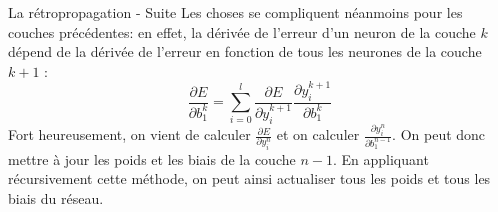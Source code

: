 \documentclass[ignorenonframetext,]{beamer}
\begin{document}
\begin{frame}{La rétropropagation - Suite}
    Les choses se compliquent néanmoins pour les couches précédentes: en effet, la dérivée de l'erreur d'un neuron de la couche $k$ dépend de la dérivée de l'erreur en fonction de tous les neurones de la couche $k+1$ :
    \[ \frac{\partial{E}}{\partial{b_1^k}} = \sum_{i=0}^l \frac{\partial{E}}{\partial{y_i^{k+1}}} \frac{\partial{y_i^{k+1}}}{\partial{b_1^k}} \]
Fort heureusement, on vient de calculer $ \frac{\partial{E}}{\partial{y_i^n}} $ et on calculer $ \frac{\partial{y_i^n}}{\partial{b_1^{n-1}}} $. On peut donc mettre à jour les poids et les biais de la couche $n-1$. En appliquant récursivement cette méthode, on peut ainsi actualiser tous les poids et tous les biais du réseau.
\end{frame}
%
%
%
%
%
%
%
%
%
%
%
%
%
%
%
%
%
%
%
%
%
%
%
%
\end{document}
